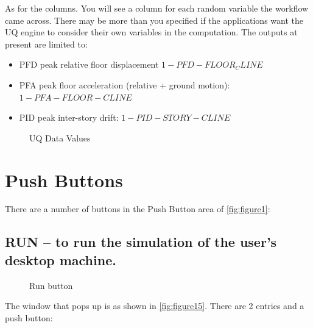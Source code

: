 As for the columns. You will see a column for each random variable the workflow came across. There may be more than you specified if the applications want the 
UQ engine to consider their own variables in the computation. The outputs at present are limited to:

\begin{itemize}
\item PFD peak relative floor displacement $1-PFD-FLOOR_CLINE$
\item PFA peak floor acceleration (relative + ground motion): $1-PFA-FLOOR-CLINE$
\item PID peak inter-story drift: $1-PID-STORY-CLINE$
\end{itemize}

\begin{figure}[!htbp]
  \caption{UQ Data Values}
  \label{fig:figure14}
\end{figure}



\section{Push Buttons}
There are a number of buttons in the Push Button area of \autoref{fig:figure1}:
\subsection{RUN – to run the simulation of the user’s desktop machine.}
\begin{figure}[!htbp]
  \caption{Run button}
  \label{fig:figure15}
\end{figure}
The window that pops up is as shown in \autoref{fig:figure15}. There are 2 entries and a push button: 

